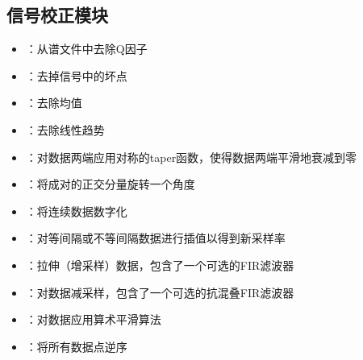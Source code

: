 \subsection*{信号校正模块}
\begin{itemize}
\item {}：从谱文件中去除Q因子
\item {}：去掉信号中的坏点
\item {}：去除均值
\item {}：去除线性趋势
\item {}：对数据两端应用对称的taper函数，使得数据两端平滑地衰减到零
\item {}：将成对的正交分量旋转一个角度
\item {}：将连续数据数字化
\item {}：对等间隔或不等间隔数据进行插值以得到新采样率
\item {}：拉伸（增采样）数据，包含了一个可选的FIR滤波器
\item {}：对数据减采样，包含了一个可选的抗混叠FIR滤波器
\item {}：对数据应用算术平滑算法
\item {}：将所有数据点逆序
\end{itemize}

